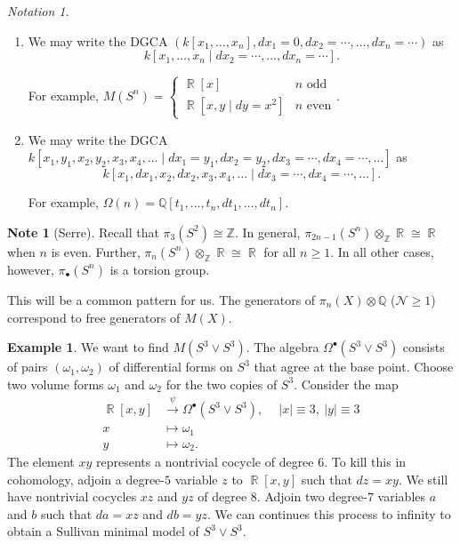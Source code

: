 \documentclass[10pt,letterpaper,cm]{nupset}
\theoremstyle{definition}
\newtheorem{exmp}[defn]{Example}
\newtheorem{note}[defn]{Note}
\theoremstyle{theorem}
\theoremstyle{remark}
\newtheorem*{notation}{Notation}
\newcommand{\Q}{\mathbb Q}
\DeclareMathOperator{\R}{\mathbb{R}}
\newcommand{\Z}{\mathbb Z}
\newcommand{\1}{\mathbb{1}}
\newcommand{\n}{\mathcal{N}}
\newcommand{\0}{\vec 0}
\newcommand{\be}{\begin{enumerate}}
\newcommand{\ee}{\end{enumerate}}
\begin{document}
\begin{notation} $ $
\be
\item We may write the DGCA $\left(k\left[x_1, \ldots, x_n\right], d{x_1} = 0, d{x_2} = \cdots,  \ldots,  d{x_n} = \cdots\right)$ as 
\[
k\left[x_1, \ldots, x_n \mid d{x_2} = \cdots, \ldots, d{x_n} = \cdots\right].
\]

For example, $M(S^n) = \begin{cases} \R\left[x\right] & \text{$n$ odd} \\ \R\left[x,y \mid d{y} = x^2\right] &  \text{$n$ even} \end{cases}$.
\item We may write the DGCA $k\left[x_1, y_1, x_2, y_2, x_3, x_4, \ldots \mid d{x_1} = y_1, d{x_2} = y_2, d{x_3} = \cdots, d{x_4} = \cdots, \ldots \right]$ as  
\[
k\left[x_1, d{x_1}, x_2, d{x_2}, x_3, x_4, \ldots \mid d{x_3} = \cdots, d{x_4} = \cdots, \ldots\right]
.\]

For example, $\Omega(n) = \Q\left[t_1, \ldots, t_n, d{t_1}, \ldots, d{t_n}\right]$.
\ee
\end{notation}


\begin{note}[Serre]
Recall that $\pi_3(S^2) \cong \Z$. In general, $\pi_{2n -1}(S^n) \otimes_{\Z} \R \cong \R$ when $n$ is even. Further, $\pi_n(S^n) \otimes_{\Z} \R \cong \R$ for all $n \geq 1$. In all other cases, however, $\pi_{\bullet}(S^n)$ is a torsion group.

\medskip

This will be a common pattern for us. The  generators of $\pi_n(X) \otimes \Q$ ($\n \geq 1$) correspond to free generators of $M(X)$.
\end{note}

\begin{exmp}\label{Sull2}
We want to find $M(S^3 \vee S^3)$. The algebra $\Omega^{\bullet}(S^3 \vee S^3)$ consists of pairs $\left(\omega_1, \omega_2\right)$ of differential forms on $S^3$ that agree at the base point. Choose two volume forms $\omega_1$ and $\omega_2$ for the two copies of $S^3$.  Consider the map
\begin{align*}
\R\left[x,y\right] &  \xrightarrow{\psi} \Omega^{\bullet}(S^3 \vee S^3), \ \quad \left\lvert{x}\right\rvert \equiv 3, \ \left\lvert{y}\right\rvert \equiv 3
\\ x & \mapsto \omega_1
\\ y & \mapsto \omega_2.
\end{align*}
The element $xy$ represents a nontrivial cocycle of degree $6$. To kill this in cohomology, adjoin a degree-$5$ variable $z$ to $\R\left[x,y\right]$ such that $d{z} = xy$. We still have nontrivial cocycles $xz$ and $yz$ of degree $8$. Adjoin two degree-$7$ variables $a$ and $b$ such that $d{a} = xz$ and $d{b} = yz$. We can continues this process to infinity to obtain a Sullivan minimal model of $S^3 \vee S^3$. 
\end{exmp}
\end{document}
